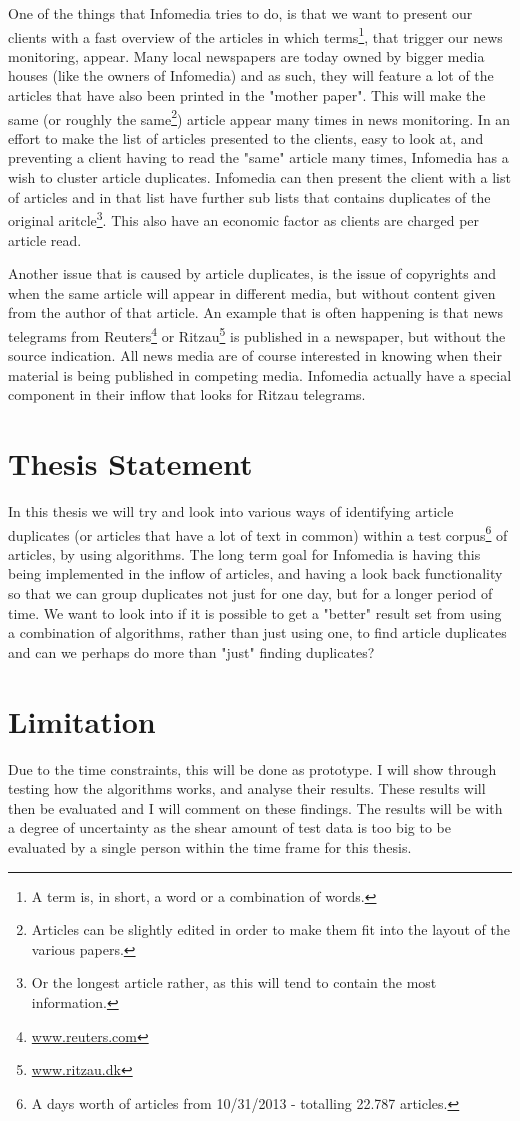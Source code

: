 One of the things that Infomedia tries to do, is that we want to present our clients with a fast overview of the articles in which terms\footnote{A term is, in short, a word or a combination of words.}, that trigger our news monitoring, appear. Many local newspapers are today owned by bigger media houses (like the owners of Infomedia) and as such, they will feature a lot of the articles that have also been printed in the "mother paper". This will make the same (or roughly the same\footnote{Articles can be slightly edited in order to make them fit into the layout of the various papers.}) article appear many times in news monitoring. In an effort to make the list of articles presented to the clients, easy to look at, and preventing a client having to read the "same" article many times, Infomedia has a wish to cluster article duplicates. Infomedia can then present the client with a list of articles and in that list have further sub lists that contains duplicates of the original aritcle\footnote{Or the longest article rather, as this will tend to contain the most information.}. This also have an economic factor as clients are charged per article read.

Another issue that is caused by article duplicates, is the issue of copyrights and when the same article will appear in different media, but without content given from the author of that article. An example that is often happening is that news telegrams from Reuters\footnote{\url{www.reuters.com}} or Ritzau\footnote{\url{www.ritzau.dk}} is published in a newspaper, but without the source indication. All news media are of course interested in knowing when their material is being published in competing media. Infomedia actually have a special component in their inflow that looks for Ritzau telegrams.

\section{Thesis Statement}

In this thesis we will try and look into various ways of identifying article duplicates (or articles that have a lot of text in common) within a test corpus\footnote{A days worth of articles from 10/31/2013 - totalling 22.787 articles.} of articles, by using algorithms. The long term goal for Infomedia is having this being implemented in the inflow of articles, and having a look back functionality so that we can group duplicates not just for one day, but for a longer period of time. We want to look into if it is possible to get a "better" result set from using a combination of algorithms, rather than just using one, to find article duplicates and can we perhaps do more than "just" finding duplicates?

\section{Limitation}
Due to the time constraints, this will be done as prototype. I will show through testing how the algorithms works, and analyse their results. These results will then be evaluated and I will comment on these findings. The results will be with a degree of uncertainty as the shear amount of test data is too big to be evaluated by a single person within the time frame for this thesis.